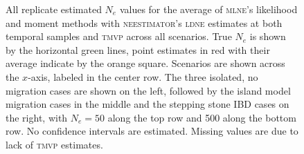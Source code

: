 \begin{landscape}
\begin{figure}[ht]
\centering
{}
\caption[All replicate estimated $N_e$ values for the average of \textsc{mlne}'s likelihood and moment methods with \textsc{neestimator}'s \textsc{ldne} estimates at both temporal samples and \textsc{tmvp} across all scenarios.]{All replicate estimated $N_e$ values for the average of \textsc{mlne}'s likelihood and moment methods with \textsc{neestimator}'s \textsc{ldne} estimates at both temporal samples and \textsc{tmvp} across all scenarios. True $N_e$ is shown by the horizontal green lines, point estimates in red with their average indicate by the orange square. Scenarios are shown across the $x$-axis, labeled in the center row. The three isolated, no migration cases are shown on the left, followed by the island model migration cases in the middle and the stepping stone IBD cases on the right, with $N_e = 50$ along the top row and 500 along the bottom row. No confidence intervals are estimated. Missing values are due to lack of \textsc{tmvp} estimates.}
\label{fig:supp_avg5}
\end{figure}



\end{landscape}






